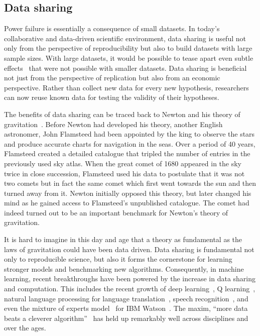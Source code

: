 \subsection*{Data sharing}
\label{sec:sommaire:intro_datasharing}
Power failure is essentially a consequence of small datasets. In today's collaborative and data-driven scientific environment, data sharing is useful not only from the perspective of reproducibility but also to build datasets with large sample sizes. With large datasets, it would be possible to tease apart even subtle effects~\citep{smith2017statistical} that were not possible with smaller datasets. Data sharing is beneficial not just from the perspective of replication but also from an economic perspective. Rather than collect new data for every new hypothesis, researchers can now reuse known data for testing the validity of their hypotheses.

The benefits of data sharing can be traced back to Newton and his theory of gravitation~\citep{pointofview2013}. Before Newton had developed his theory, another English astronomer, John Flamsteed had been appointed by the king to observe the stars and produce accurate charts for navigation in the seas. Over a period of 40 years, Flamsteed created a detailed catalogue that tripled the number of entries in the previously used sky atlas. When the great comet of 1680 appeared in the sky twice in close succession, Flamsteed used his data to postulate that it was not two comets but in fact the same comet which first went towards the sun and then turned away from it. Newton initially opposed this theory, but later changed his mind as he gained access to Flamsteed's unpublished catalogue. The comet had indeed turned out to be an important benchmark for Newton's theory of gravitation.

It is hard to imagine in this day and age that a theory as fundamental as the laws of gravitation could have been data driven. Data sharing is fundamental not only to reproducible science, but also it forms the cornerstone for learning stronger models and benchmarking new algorithms. Consequently, in machine learning, recent breakthroughs have been powered by the increase in data sharing and computation. This includes the recent growth of deep learning~\citep{deng2009imagenet}, Q learning~\citep{watkins1992q, bellemare2013arcade}, natural language processing for language translation~\citep{halevy2009unreasonable}, speech recognition~\citep{paul1992design}, and even the mixture of experts model~\citep{jacobs1991adaptive} for IBM Watson~\citep{ferrucci2010building}. The maxim, ``more data beats a cleverer algorithm''~\citep{domingos2012few} has held up remarkably well across disciplines and over the ages.

